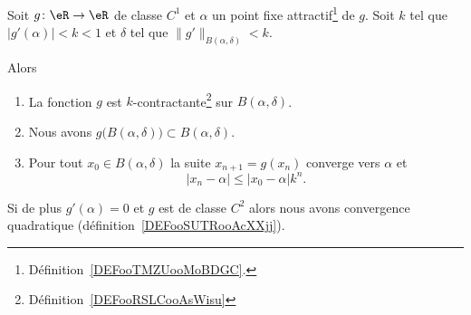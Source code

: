 \begin{proposition}      \label{PROPooRPHKooLnPCVJ}
    Soit \( g\colon \eR\to \eR\) de classe \( C^1\) et \( \alpha\) un point fixe attractif\footnote{Définition~\ref{DEFooTMZUooMoBDGC}.} de \( g\). Soit \( k\) tel que \( | g'(\alpha) |<k<1\) et \( \delta\) tel que \( \| g' \|_{B(\alpha,\delta)}<k\).

    Alors
    \begin{enumerate}
        \item       \label{ITEMooOQKMooTRSvUo}
            La fonction \( g\) est \( k\)-contractante\footnote{Définition~\ref{DEFooRSLCooAsWisu}} sur \( B(\alpha,\delta)\).
        \item       \label{ITEMooFTAQooPBsBcR}
            Nous avons \( g\big( B(\alpha,\delta) \big)\subset B(\alpha,\delta)\).
        \item       \label{ITEMooFSOAooKlcxih}
            Pour tout \( x_0\in B(\alpha,\delta)\) la suite \( x_{n+1}=g(x_n)\) converge vers \( \alpha\) et
            \begin{equation}
                | x_n-\alpha |\leq | x_0-\alpha |k^n.
            \end{equation}
    \end{enumerate}
    Si de plus \( g'(\alpha)=0\) et \( g\) est de classe \( C^2\) alors nous avons convergence quadratique (définition~\ref{DEFooSUTRooAcXXjj}).
\end{proposition}

